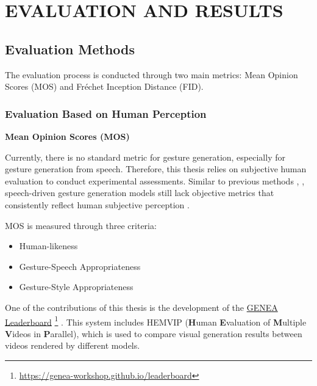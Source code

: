 

\section{EVALUATION AND RESULTS}
\label{chap:evalution}

\subsection{Evaluation Methods}

The evaluation process is conducted through two main metrics: Mean Opinion Scores (MOS) and Fréchet Inception Distance (FID).

\subsubsection{Evaluation Based on Human Perception}

\textbf{Mean Opinion Scores (MOS)}

Currently, there is no standard metric for gesture generation, especially for gesture generation from speech. Therefore, this thesis relies on subjective human evaluation to conduct experimental assessments. 
Similar to previous methods \cite{yoon2022genea}, \cite{kucherenko2021large}, speech-driven gesture generation models still lack objective metrics that consistently reflect human subjective perception \cite{alexanderson2022listen}.

MOS is measured through three criteria:

\begin{itemize}
	\item Human-likeness
	\item Gesture-Speech Appropriateness
	\item Gesture-Style Appropriateness
\end{itemize}

One of the contributions of this thesis is the development of the \hyperlink{https://genea-workshop.github.io/leaderboard/}{GENEA Leaderboard} \footnote{ \url{https://genea-workshop.github.io/leaderboard} } \cite{nagy2024towards}. This system includes HEMVIP (\textbf{H}uman \textbf{E}valuation of \textbf{M}ultiple \textbf{V}ideos in \textbf{P}arallel), which is used to compare visual generation results between videos rendered by different models.



